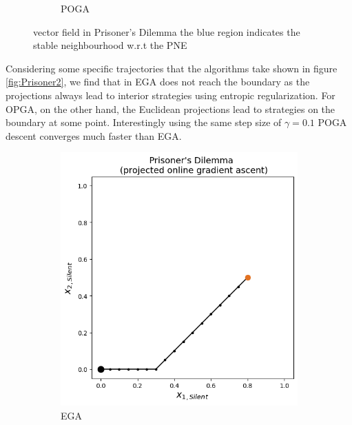 \begin{figure}[H]
\begin{subfigure}{.5\textwidth}
    \caption{POGA}
\end{subfigure}
\caption{vector field in Prisoner's Dilemma the blue region indicates the stable neighbourhood w.r.t the PNE}
\label{fig:Prisoner}
\end{figure}

Considering some specific trajectories that the algorithms take shown in figure \ref{fig:Prisoner2}, we find that in EGA does not reach the boundary as the projections always lead to interior strategies using entropic regularization. For OPGA, on the other hand, the Euclidean projections lead to strategies on the boundary at some point. Interestingly using the same step size of $\gamma = 0.1$ POGA descent converges much faster than EGA. 

\begin{figure}[H]
\captionsetup{justification=centering}
\centering
\begin{subfigure}{.5\textwidth}
    \centering
    \includegraphics[width=\textwidth]{logos/Prisoner4.png}
    \caption{EGA}
\end{subfigure}%
\begin{subfigure}{.5\textwidth}
    \centering

\end{subfigure}
\end{figure}

